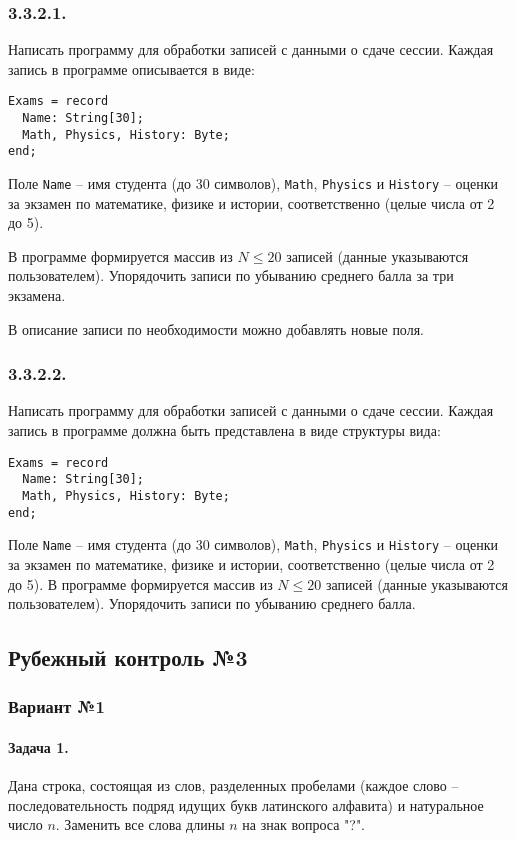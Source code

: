 \documentclass[12pt,a4paper]{report}
\begin{document}
\subsubsection{ 3.3.2.1. }
Написать программу для обработки записей с данными о сдаче сессии. Каждая запись в программе описывается в виде:
\begin{verbatim}
Exams = record
  Name: String[30];
  Math, Physics, History: Byte;
end;
\end{verbatim}
Поле \texttt{Name} -- имя студента (до 30 символов), \texttt{Math}, \texttt{Physics} и \texttt{History} -- оценки за экзамен по математике, физике и истории, соответственно (целые числа от 2 до 5).

В программе формируется массив из $N \le 20$ записей (данные указываются пользователем). Упорядочить записи по убыванию среднего балла за три экзамена.

В описание записи по необходимости можно добавлять новые поля.


\subsubsection{ 3.3.2.2. }
Написать программу для обработки записей с данными о сдаче сессии. Каждая запись в программе должна быть представлена в виде структуры вида:
\begin{verbatim}
Exams = record
  Name: String[30];
  Math, Physics, History: Byte;
end;
\end{verbatim}
Поле \texttt{Name} -- имя студента (до 30 символов), \texttt{Math}, \texttt{Physics} и \texttt{History} -- оценки за экзамен по математике, физике и истории, соответственно (целые числа от 2 до 5).
В программе формируется массив из $N \le 20$ записей (данные указываются пользователем). Упорядочить записи по убыванию среднего балла.



\clearpage
\subsection*{Рубежный контроль №3}
\subsubsection*{Вариант №1}
\paragraph*{Задача 1.} Дана строка, состоящая из слов, разделенных пробелами (каждое слово -- последовательность подряд идущих букв латинского алфавита) и натуральное число $n$. Заменить все слова длины $n$ на знак вопроса "?".
\end{document}
